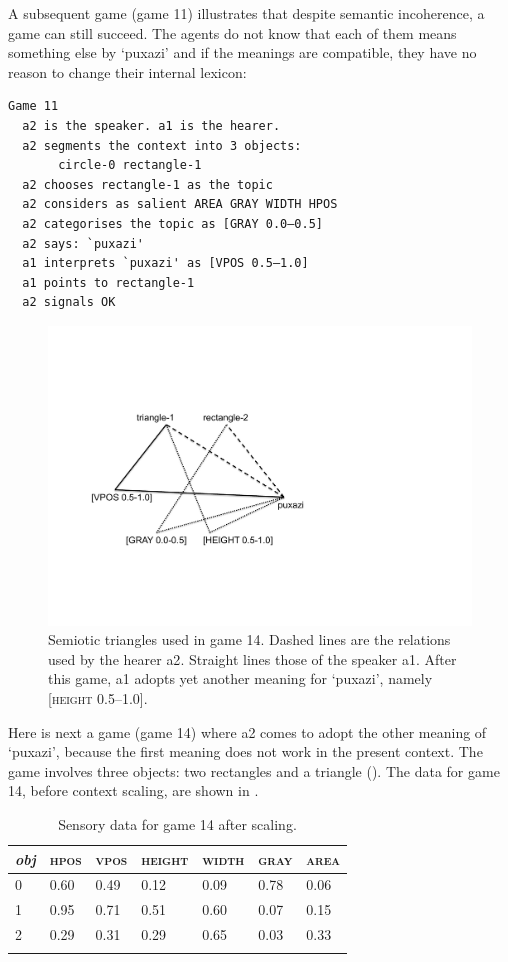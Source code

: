 A subsequent game (game 11) illustrates that despite 
semantic incoherence, a game can still succeed. The agents 
do not know that each of them means something else by 
`puxazi' and if the meanings are compatible, they 
have no reason to change their internal lexicon:

\begin{verbatim}
Game 11
  a2 is the speaker. a1 is the hearer. 
  a2 segments the context into 3 objects: 
       circle-0 rectangle-1
  a2 chooses rectangle-1 as the topic 
  a2 considers as salient AREA GRAY WIDTH HPOS 
  a2 categorises the topic as [GRAY 0.0–0.5]
  a2 says: `puxazi'
  a1 interprets `puxazi' as [VPOS 0.5–1.0]
  a1 points to rectangle-1
  a2 signals OK 
\end{verbatim}



\begin{figure}[htbp]
  \centerline{\includegraphics[width=.60\textwidth]{chap6/figs/triangle3.pdf}}
\caption{\label{triangle3}Semiotic triangles used in
game 14. Dashed lines are the relations used by 
the hearer {\bfshape  a2}. Straight lines those of the 
speaker {\bfshape  a1}. After this game, {\bfshape  a1}
adopts yet another meaning for `puxazi', namely 
{}[\textsc{height} 0.5–1.0].}
\end{figure}
Here is next a game (game 14) where {\bfshape  a2} comes to adopt 
the other meaning of `puxazi', because the first
meaning does not work in the present context. 
The game involves three objects: two rectangles and a 
triangle ().
The data for game 14, before context scaling, are
shown in . 


\begin{table}
\begin{center}
\begin{tabular}{ l  l  l  l  l  l  l }
\lsptoprule
{\itshape obj} & \textsc{hpos} & \textsc{vpos} & \textsc{height} & \textsc{width} & \textsc{gray} & \textsc{area} \\ \midrule
0 & 0.60 & 0.49 & 0.12 & 0.09 & 0.78 & 0.06\\ 
1 & 0.95 & 0.71 & 0.51 & 0.60 & 0.07 & 0.15\\ 
2 & 0.29 & 0.31 & 0.29 & 0.65 & 0.03 & 0.33\\ 
\lspbottomrule
\end{tabular}
\caption{\label{tab:game14}Sensory data for game 14 after scaling.}
\end{center}
\end{table}

